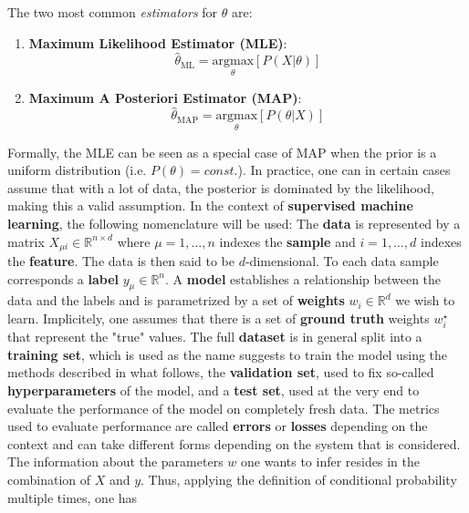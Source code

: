 \documentclass{article}
\begin{document}
The two most common \emph{estimators} for $\theta$ are:
\begin{enumerate}
    \item \textbf{Maximum Likelihood Estimator (MLE)}:
        \begin{equation*}
            \hat{\theta}_{\text{ML}}
            =
            \underset{\theta}{\text{argmax}} \left[ P(X|\theta) \right]
        \end{equation*}
    \item \textbf{Maximum A Posteriori Estimator (MAP)}:
        \begin{equation*}
            \hat{\theta}_{\text{MAP}}
            =
            \underset{\theta}{\text{argmax}} \left[ P(\theta|X) \right]
        \end{equation*}
\end{enumerate}
Formally, the MLE can be seen as a special case of MAP when the prior is a uniform distribution (i.e. $P(\theta) = const.$). In practice, one can in certain cases assume that with a lot of data, the posterior is dominated by the likelihood, making this a valid assumption.
\noindent In the context of \textbf{supervised machine learning}, the following nomenclature will be used:
The \textbf{data} is represented by a matrix $X_{\mu i} \in \mathbb{R}^{n \times d}$ where $\mu = 1,\dots,n$ indexes the \textbf{sample} and $i = 1,\dots,d$ indexes the \textbf{feature}. The data is then said to be $d$-dimensional. To each data sample corresponds a \textbf{label} $y_{\mu} \in \mathbb{R}^n$. A \textbf{model} establishes a relationship between the data and the labels and is parametrized by a set of \textbf{weights} $w_i \in \mathbb{R}^d$ we wish to learn. Implicitely, one assumes that there is a set of \textbf{ground truth} weights $w_i^{\star}$ that represent the "true" values. The full \textbf{dataset} is in general split into a \textbf{training set}, which is used as the name suggests to train the model using the methods described in what follows, the \textbf{validation set}, used to fix so-called \textbf{hyperparameters} of the model, and a \textbf{test set}, used at the very end to evaluate the performance of the model on completely fresh data. The metrics used to evaluate performance are called \textbf{errors} or \textbf{losses} depending on the context and can take different forms depending on the system that is considered. The information about the parameters $w$ one wants to infer resides in the combination of $X$ and $y$. Thus, applying the definition of conditional probability multiple times, one has
\end{document}
